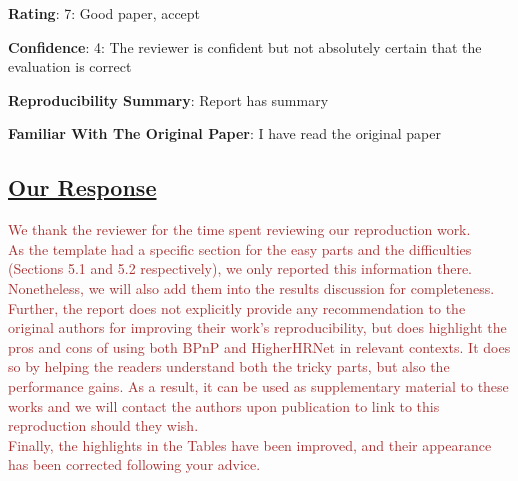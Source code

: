 \documentclass{article}
\begin{document}
\textbf{Rating}: 7: Good paper, accept

\textbf{Confidence}: 4: The reviewer is confident but not absolutely certain that the evaluation is correct

\textbf{Reproducibility Summary}: Report has summary

\textbf{Familiar With The Original Paper}: I have read the original paper

\subsection{\uline{Our Response}}

\textcolor{brown}{
We thank the reviewer for the time spent reviewing our reproduction work.\\
As the template had a specific section for the easy parts and the difficulties (Sections 5.1 and 5.2 respectively), we only reported this information there.
Nonetheless, we will also add them into the results discussion for completeness. \\
Further, the report does not explicitly provide any recommendation to the original authors for improving their work's reproducibility, but does highlight the pros and cons of using both BPnP and HigherHRNet in relevant contexts.
It does so by helping the readers understand both the tricky parts, but also the performance gains.
As a result, it can be used as supplementary material to these works and we will contact the authors upon publication to link to this reproduction should they wish.\\
Finally, the highlights in the Tables have been improved, and their appearance has been corrected following your advice.
}

\iffalse
\begin{enumerate}
    \item As the template had a specific section for the difficulties (sec 5.2), we only reported the harder parts there, but will also add them into the results discussion for completeness. 
    \item The report does not explicitly provide any recommendation to the original authors for improving their work's reproducibility, but does highlight the pros and cons of using both BPnP and HigherHRNet in relevant contexts, while also helping the readers understand the tricky parts, but also the performance boost they will offer.
    As a result, it can be used as supplementary material to these works and we will contact the authors upon publication to link to it should they wish.
    \item We have corrected the appearance of the tables following your advice.
\end{enumerate}
\fi
\end{document}
